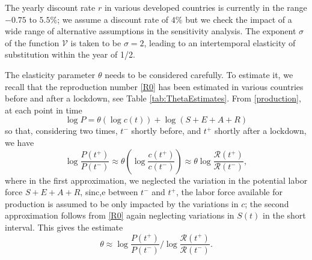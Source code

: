\documentclass{amsart}
\begin{document}

The yearly discount rate $r$ in various developed countries \color{black}  is currently in the range $-0.75$ to $5.5\%$; we assume a discount rate of $4\%$ but we check the impact of a wide range of alternative assumptions in the sensitivity analysis.
The exponent $\sigma$ of the function $\mathcal{V}$
is taken to be $\sigma=2$, leading to an intertemporal elasticity of substitution within the year of 1/2.


The elasticity parameter $\theta$ needs to be considered carefully.
To estimate it, we recall that the reproduction number
 \eqref{R0} has been estimated in various countries 
 before and after a lockdown, see Table \ref{tab:ThetaEstimates}. From \eqref{production},
 at each point in time
\[
\log P=\theta\left(\log c(t)\right)+\log(S+E+A+R)
\]
so that, considering two times,
$t^-$ shortly before, and $t^+$ shortly after
a lockdown, we have
\[
\log\frac{P(t^{+})}{P(t^{-})} \approx \theta\left(\log\frac{c(t^{+})}{c(t^{-})}\right) \approx \theta
\log\frac{\mathcal{R}(t^{+})}{\mathcal{R}(t^{-})},
\]
where in the first approximation,
we neglected the variation in the potential labor force $S+E+A+R$, sinc,e between $t^{-}$ and $t^{+}$, 
the labor force available for production is  assumed to be only impacted by the variations in $c$; the second
approximation follows
from  \eqref{R0} again
neglecting variations in $S(t)$ in the short interval.
This gives the estimate
\begin{equation}\label{eq:theta_calc}
\theta \approx\log\frac{P(t^{+})}{P(t^{-})}/\log\frac{\mathcal{R}(t^{+})}{\mathcal{R}(t^{-})}.
\end{equation}
\end{document}
